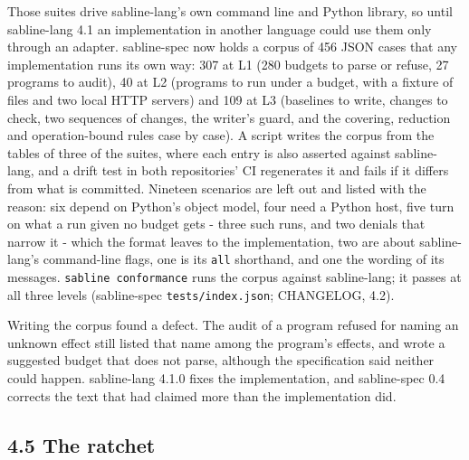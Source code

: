 \documentclass[
]{article}
\begin{document}
Those suites drive sabline-lang's own command line and Python library,
so until sabline-lang 4.1 an implementation in another language could
use them only through an adapter. sabline-spec now holds a corpus of 456
JSON cases that any implementation runs its own way: 307 at L1 (280
budgets to parse or refuse, 27 programs to audit), 40 at L2 (programs to
run under a budget, with a fixture of files and two local HTTP servers)
and 109 at L3 (baselines to write, changes to check, two sequences of
changes, the writer's guard, and the covering, reduction and
operation-bound rules case by case). A script writes the corpus from the
tables of three of the suites, where each entry is also asserted against
sabline-lang, and a drift test in both repositories' CI regenerates it
and fails if it differs from what is committed. Nineteen scenarios are
left out and listed with the reason: six depend on Python's object
model, four need a Python host, five turn on what a run given no budget
gets - three such runs, and two denials that narrow it - which the
format leaves to the implementation, two are about sabline-lang's
command-line flags, one is its \texttt{all} shorthand, and one the
wording of its messages. \texttt{sabline\ conformance} runs the corpus
against sabline-lang; it passes at all three levels (sabline-spec
\texttt{tests/index.json}; CHANGELOG, 4.2).

Writing the corpus found a defect. The audit of a program refused for
naming an unknown effect still listed that name among the program's
effects, and wrote a suggested budget that does not parse, although the
specification said neither could happen. sabline-lang 4.1.0 fixes the
implementation, and sabline-spec 0.4 corrects the text that had claimed
more than the implementation did.

\subsection{4.5 The ratchet}\label{the-ratchet-1}
\end{document}

